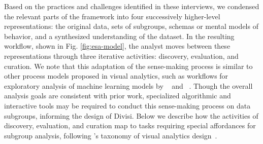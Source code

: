 Based on the practices and challenges identified in these interviews, we condensed the relevant parts of the \citeauthor{pirolli_sensemaking_2005}  framework into four successively higher-level representations: the original data, sets of subgroups, schemas or mental models of behavior, and a synthesized understanding of the dataset.
In the resulting workflow, shown in Fig. \ref{fig:esa-model}, the analyst moves between these representations through three iterative activities: discovery, evaluation, and curation.
We note that this adaptation of the sense-making process is similar to other process models proposed in visual analytics, such as workflows for exploratory analysis of machine learning models by \citeauthor{cabrera_what_2022}~\cite{cabrera_what_2022} and \citeauthor{zhang_manifold_2019}~\cite{zhang_manifold_2019}.
Though the overall analysis goals are consistent with prior work, specialized algorithmic and interactive tools may be required to conduct this sense-making process on data subgroups, informing the design of Divisi.
Below we describe how the activities of discovery, evaluation, and curation map to tasks requiring special affordances for subgroup analysis, following \citeauthor{munzner_nested_2009}'s taxonomy of visual analytics design~\cite{munzner_nested_2009}.



